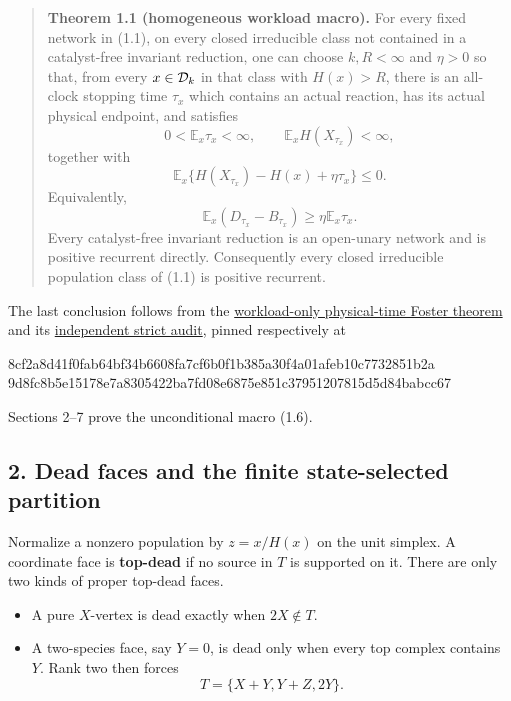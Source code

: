 \begin{quote}
\textbf{Theorem 1.1 (homogeneous workload macro).} For every fixed
network in (1.1), on every closed irreducible class not contained in a
catalyst-free invariant reduction, one can choose \(k,R<\infty\) and
\(\eta>0\) so that, from every \(x\in{\cal D}_k\) in that class with
\(H(x)>R\), there is an all-clock stopping time \(\tau_x\) which
contains an actual reaction, has its actual physical endpoint, and
satisfies \[
 0<\mathbb E_x\tau_x<\infty,\qquad
 \mathbb E_x H(X_{\tau_x})<\infty,
\] together with \[
 \mathbb E_x\{H(X_{\tau_x})-H(x)+\eta\tau_x\}\le0. \tag{1.6}
\] Equivalently, \[
                \mathbb E_x(D_{\tau_x}-B_{\tau_x})
                        \ge\eta\mathbb E_x\tau_x. \tag{1.7}
\] Every catalyst-free invariant reduction is an open-unary network and
is positive recurrent directly. Consequently every closed irreducible
population class of (1.1) is positive recurrent.
\end{quote}

The last conclusion follows from the
\href{proof_first_levelset_h_alone_physical_time_foster_lemma.md}{workload-only
physical-time Foster theorem} and its
\href{proof_first_levelset_h_alone_physical_time_foster_lemma_exact_byte_audit.md}{independent
strict audit}, pinned respectively at

\begin{CodeBlock}
8cf2a8d41f0fab64bf34b6608fa7cf6b0f1b385a30f4a01afeb10c7732851b2a
9d8fc8b5e15178e7a8305422ba7fd08e6875e851c37951207815d5d84babcc67
\end{CodeBlock}

Sections 2--7 prove the unconditional macro (1.6).

\subsection{2. Dead faces and the finite state-selected
partition}

Normalize a nonzero population by \(z=x/H(x)\) on the unit simplex. A
coordinate face is \textbf{top-dead} if no source in \(T\) is supported
on it. There are only two kinds of proper top-dead faces.

\begin{itemize}
\tightlist
\item
  A pure \(X\)-vertex is dead exactly when \(2X\notin T\).
\item
  A two-species face, say \(Y=0\), is dead only when every top complex
  contains \(Y\). Rank two then forces \[
                         T=\{X+Y,Y+Z,2Y\}.            \tag{2.1}
  \]
\end{itemize}

